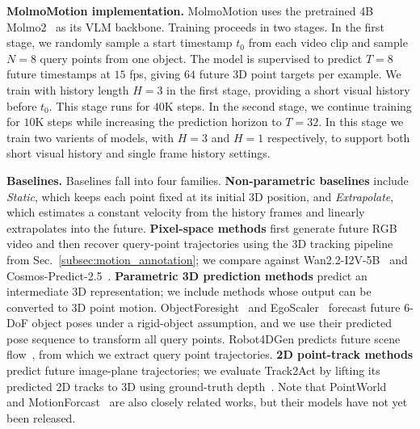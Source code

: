 \documentclass{llmxive}
\providecommand{\modelname}{MolmoMotion\xspace}
\begin{document}
\noindent\textbf{\modelname implementation.}
\modelname uses the pretrained 4B Molmo2~\cite{clark2026molmo2} as its VLM backbone. Training proceeds in two stages. In the first stage, we randomly sample a start timestamp $t_0$ from each video clip and sample $N=8$ query points from one object. The model is supervised to predict $T=8$ future timestamps at $15$ fps, giving $64$ future 3D point targets per example. 
We train with history length $H = 3$ in the first stage, providing a short visual history before $t_0$. This stage runs for $40$K steps. In the second stage, we continue training for $10$K steps while increasing the prediction horizon to $T=32$. In this stage we train two varients of models, with $H = 3$ and $H = 1$ respectively, to support both short visual history and single frame history settings.



\noindent \textbf{Baselines.} 
Baselines fall into four families. \textbf{Non-parametric baselines} include \textit{Static}, which keeps each point fixed at its initial 3D position, and \textit{Extrapolate}, which estimates a constant velocity from the history frames and linearly extrapolates into the future. \textbf{Pixel-space methods} first generate future RGB video and then recover query-point trajectories using the 3D tracking pipeline from Sec.~\ref{subsec:motion_annotation}; we compare against Wan2.2-I2V-5B~\cite{wan22} and Cosmos-Predict-2.5~\cite{nvidia2025cosmos}. \textbf{Parametric 3D prediction methods} predict an intermediate 3D representation; we include methods whose output can be converted to 3D point motion. ObjectForesight~\cite{soraki2026objectforesightpredictingfuture3d} and EgoScaler~\cite{Yoshida_2025_CVPR} forecast future 6-DoF object poses under a rigid-object assumption, and we use their predicted pose sequence to transform all query points. Robot4DGen predicts future scene flow~\cite{liu2025geometryaware4dvideo}, from which we extract query point trajectories. \textbf{2D point-track methods} predict future image-plane trajectories; we evaluate Track2Act by lifting its predicted 2D tracks to 3D using ground-truth depth~\cite{track2act}. Note that PointWorld~\cite{pointworld} and MotionForcast~\cite{thakkar2026forecastingmotion} are also closely related works, but their models have not yet been released.
\end{document}
